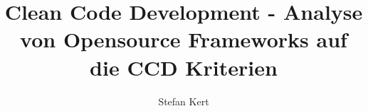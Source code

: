 \documentclass[bachelor,german]{hgbthesis}
\begin{document}
\title{Clean Code Development - Analyse von Opensource Frameworks auf die CCD Kriterien}
\author{Stefan Kert}
\frontmatter
\maketitle
\tableofcontents

		
			

\mainmatter 










\appendix

\MakeBibliography
\end{document}
